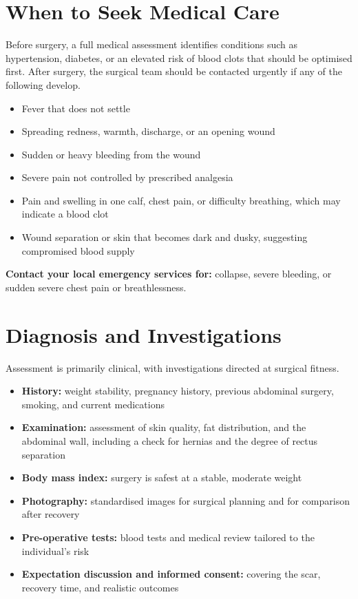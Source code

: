 \section*{When to Seek Medical Care}
Before surgery, a full medical assessment identifies conditions such as hypertension, diabetes, or an elevated risk of blood clots that should be optimised first. After surgery, the surgical team should be contacted urgently if any of the following develop.

\begin{itemize}
    \item Fever that does not settle
    \item Spreading redness, warmth, discharge, or an opening wound
    \item Sudden or heavy bleeding from the wound
    \item Severe pain not controlled by prescribed analgesia
    \item Pain and swelling in one calf, chest pain, or difficulty breathing, which may indicate a blood clot
    \item Wound separation or skin that becomes dark and dusky, suggesting compromised blood supply
\end{itemize}

\textbf{Contact your local emergency services for:} collapse, severe bleeding, or sudden severe chest pain or breathlessness.

\section*{Diagnosis and Investigations}
Assessment is primarily clinical, with investigations directed at surgical fitness.

\begin{itemize}
    \item \textbf{History:} weight stability, pregnancy history, previous abdominal surgery, smoking, and current medications
    \item \textbf{Examination:} assessment of skin quality, fat distribution, and the abdominal wall, including a check for hernias and the degree of rectus separation
    \item \textbf{Body mass index:} surgery is safest at a stable, moderate weight
    \item \textbf{Photography:} standardised images for surgical planning and for comparison after recovery
    \item \textbf{Pre-operative tests:} blood tests and medical review tailored to the individual's risk
    \item \textbf{Expectation discussion and informed consent:} covering the scar, recovery time, and realistic outcomes
\end{itemize}

